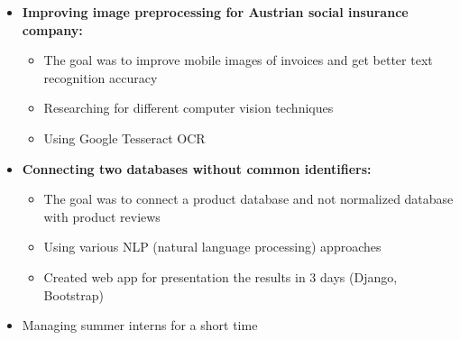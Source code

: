 \documentclass[11pt,a4paper,sans]{moderncv}        %
\begin{document}
{\begin{itemize}
\begin{itemize}
    \end{itemize}
    \item \textbf{Improving image preprocessing for Austrian social insurance company:}
    \begin{itemize}
        \item The goal was to improve mobile images of invoices and get better text recognition accuracy 
        \item Researching for different computer vision techniques
        \item Using Google Tesseract OCR
    \end{itemize}
    \item \textbf{Connecting two databases without common identifiers:}
    \begin{itemize}
        \item The goal was to connect a product database and not normalized database with product reviews 
        \item Using various NLP (natural language processing) approaches
        \item Created web app for presentation the results in 3 days (Django, Bootstrap)
    \end{itemize}
    \item Managing summer interns for a short time
\end{itemize}
}



\end{document}
